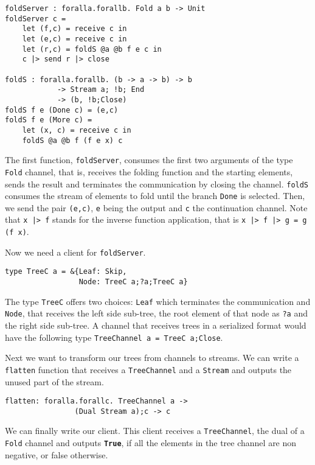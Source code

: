 \begin{lstlisting}
foldServer : foralla.forallb. Fold a b -> Unit
foldServer c = 
    let (f,c) = receive c in 
    let (e,c) = receive c in 
    let (r,c) = foldS @a @b f e c in
    c |> send r |> close
               
foldS : foralla.forallb. (b -> a -> b) -> b 
            -> Stream a; !b; End 
            -> (b, !b;Close)
foldS f e (Done c) = (e,c)
foldS f e (More c) = 
    let (x, c) = receive c in
    foldS @a @b f (f e x) c
\end{lstlisting}
\vspace{3mm}
The first function, \lstinline|foldServer|, consumes the first two arguments of the type \lstinline|Fold| channel, that is, receives the folding function and the starting elements, sends the result and terminates the communication by closing the channel. \lstinline|foldS| consumes the stream of elements to fold until the branch \lstinline|Done| is selected. Then, we send the pair \lstinline|(e,c)|, \lstinline|e| being the output and \lstinline|c| the continuation channel.
Note that \lstinline{x |> f} stands for the inverse function application, that is \lstinline{x |> f |> g = g (f x)}.

Now we need a client for \lstinline|foldServer|. 

\begin{lstlisting}
type TreeC a = &{Leaf: Skip, 
                 Node: TreeC a;?a;TreeC a}
\end{lstlisting}
\vspace{3mm}

The type \lstinline|TreeC| offers two choices: \lstinline|Leaf| which terminates the communication and \lstinline|Node|, that receives the left side sub-tree, the root element of that node as \lstinline|?a| and the right side sub-tree.
A channel that receives trees in a serialized format would have the following type \lstinline|TreeChannel a = TreeC a;Close|.

Next we want to transform our trees from channels to streams. We can write a \lstinline|flatten| function that receives a \lstinline|TreeChannel| and a \lstinline|Stream| and outputs the unused part of the stream.

\begin{lstlisting}
flatten: foralla.forallc. TreeChannel a ->
                (Dual Stream a);c -> c
\end{lstlisting}
\vspace{3mm}

We can finally write our client. This client receives a \lstinline|TreeChannel|, the dual of a \lstinline|Fold| channel and outputs \textbf{\lstinline|True|}, if all the elements in the tree channel are non negative, or false otherwise.

